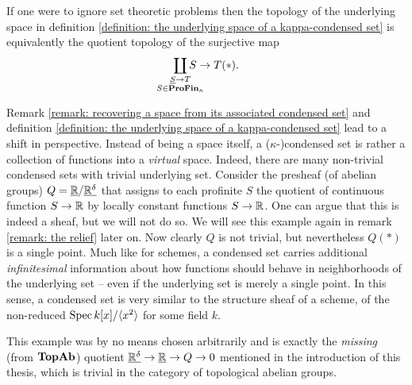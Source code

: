 \begin{remark}
	If one were to ignore set theoretic problems then the topology of the underlying space in definition \ref{definition: the underlying space of a kappa-condensed set} is equivalently the quotient topology of the surjective map
		$$\smashoperator{\coprod_{\substack{\associated{S}\to T\\S\in\boundedProFiniteSets{\kappa}}}} S\to T(\ast).$$
\end{remark}


\begin{remark}
	\label{remark: a shift in perspective}
	
	Remark \ref{remark: recovering a space from its associated condensed set} and definition \ref{definition: the underlying space of a kappa-condensed set} lead to a shift in perspective. Instead of being a space itself, a ($\kappa$-)condensed set is rather a collection of functions into a \emph{virtual} space. Indeed, there are many non-trivial condensed sets with trivial underlying set. Consider \eg the presheaf (of abelian groups) $Q = \underline{{\mathbb{R}}}/\underline{{\mathbb{R}}^\delta}$ that assigns to each profinite $S$ the quotient of continuous function $S\to {\mathbb{R}}$ by locally constant functions $S\to {\mathbb{R}}$. One can argue that this is indeed a sheaf, but we will not do so. We will see this example again in remark \ref{remark: the relief} later on. Now clearly $Q$ is not trivial, but nevertheless $Q(\ast)$ is a single point. Much like for schemes, a condensed set carries additional \emph{infinitesimal} information about how functions should behave in neighborhoods of the underlying set -- even if the underlying set is merely a single point. In this sense, a condensed set is very similar to the structure sheaf of a scheme, \eg of the non-reduced $\operatorname{Spec} k[x]/{\langle x^2\rangle}$ for some field $k$.
	
	This example was by no means chosen arbitrarily and is exactly the \emph{missing} (from ${{\mathbf{TopAb}}}$) quotient $\underline{{\mathbb{R}}^\delta}\to\underline{{\mathbb{R}}}\to Q\to 0$ mentioned in the introduction of this thesis, which is trivial in the category of topological abelian groups.
\end{remark}

